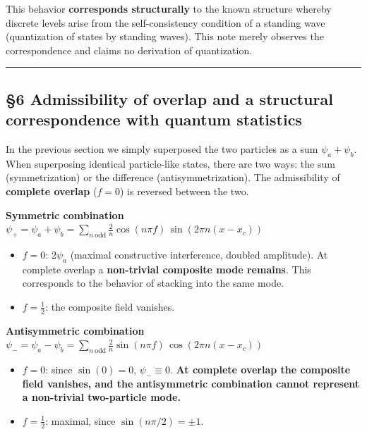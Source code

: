 \documentclass[
]{article}
\providecommand{\tightlist}{%
  \setlength{\itemsep}{0pt}\setlength{\parskip}{0pt}}
\begin{document}
This behavior \textbf{corresponds structurally} to the known structure
whereby discrete levels arise from the self-consistency condition of a
standing wave (quantization of states by standing waves). This note
merely observes the correspondence and claims no derivation of
quantization.

\begin{center}\rule{0.5\linewidth}{0.5pt}\end{center}

\subsection{§6 Admissibility of overlap and a structural correspondence
with quantum
statistics}\label{admissibility-of-overlap-and-a-structural-correspondence-with-quantum-statistics}

In the previous section we simply superposed the two particles as a sum
\(\psi_a+\psi_b\). When superposing identical particle-like states,
there are two ways: the sum (symmetrization) or the difference
(antisymmetrization). The admissibility of \textbf{complete overlap}
(\(f=0\)) is reversed between the two.

\textbf{Symmetric combination}
\(\psi_{+}=\psi_a+\psi_b=\displaystyle\sum_{n\ \mathrm{odd}}\frac{2}{n}\cos(n\pi f)\,\sin(2\pi n(x-x_c))\)

\begin{itemize}
\tightlist
\item
  \(f=0\): \(2\psi_a\) (maximal constructive interference, doubled
  amplitude). At complete overlap a \textbf{non-trivial composite mode
  remains}. This corresponds to the behavior of stacking into the same
  mode.
\item
  \(f=\tfrac12\): the composite field vanishes.
\end{itemize}

\textbf{Antisymmetric combination}
\(\psi_{-}=\psi_a-\psi_b=\displaystyle\sum_{n\ \mathrm{odd}}\frac{2}{n}\sin(n\pi f)\,\cos(2\pi n(x-x_c))\)

\begin{itemize}
\tightlist
\item
  \(f=0\): since \(\sin(0)=0\), \(\psi_{-}\equiv0\). \textbf{At complete
  overlap the composite field vanishes, and the antisymmetric
  combination cannot represent a non-trivial two-particle mode.}
\item
  \(f=\tfrac12\): maximal, since \(\sin(n\pi/2)=\pm1\).
\end{itemize}
\end{document}
